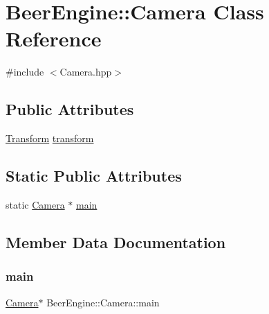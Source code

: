 \hypertarget{class_beer_engine_1_1_camera}{}\section{Beer\+Engine\+:\+:Camera Class Reference}
\label{class_beer_engine_1_1_camera}


{\ttfamily \#include $<$Camera.\+hpp$>$}

\subsection*{Public Attributes}
\begin{DoxyCompactItemize}
\item 
\mbox{\hyperlink{class_beer_engine_1_1_transform}{Transform}} \mbox{\hyperlink{class_beer_engine_1_1_camera_a4bbec6c322e5f260eca34a98d2eaeb93}{transform}}
\end{DoxyCompactItemize}
\subsection*{Static Public Attributes}
\begin{DoxyCompactItemize}
\item 
static \mbox{\hyperlink{class_beer_engine_1_1_camera}{Camera}} $\ast$ \mbox{\hyperlink{class_beer_engine_1_1_camera_aca558a665afcf487dc66e7deb5edba58}{main}}
\end{DoxyCompactItemize}


\subsection{Member Data Documentation}
\mbox{\label{class_beer_engine_1_1_camera_aca558a665afcf487dc66e7deb5edba58}} 
\subsubsection{\texorpdfstring{main}{main}}
{\footnotesize\ttfamily \mbox{\hyperlink{class_beer_engine_1_1_camera}{Camera}}$\ast$ Beer\+Engine\+::\+Camera\+::main\hspace{0.3cm}{\ttfamily [static]}}

\mbox{\label{class_beer_engine_1_1_camera_a4bbec6c322e5f260eca34a98d2eaeb93}} 
